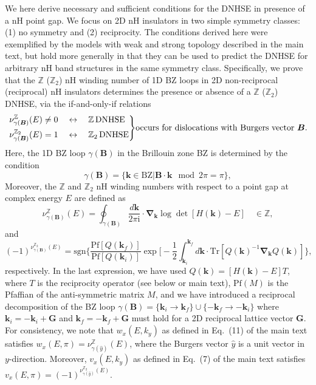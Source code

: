 \documentclass[prb,reprint,twocolumn,preprintnumbers,amsmath,amssymb,showpacs,nofootinbib,superscriptaddress]{revtex4-2}
\newenvironment{rcases}
  {\left.\begin{aligned}}
  {\end{aligned}\right\rbrace}
\newcommand{\bs}[1]{\boldsymbol{#1}}
\begin{document}
We here derive necessary and sufficient conditions for the DNHSE in presence of a nH point gap. We focus on 2D nH insulators in two simple symmetry classes: (1) no symmetry and (2) reciprocity. The conditions derived here were exemplified by the models with weak and strong topology described in the main text, but hold more generally in that they can be used to predict the DNHSE for arbitrary nH band structures in the same symmetry class.
Specifically, we prove that the $\mathbb{Z}$ ($\mathbb{Z}_2$) nH winding number of 1D BZ loops in 2D non-reciprocal (reciprocal) nH insulators determines the presence or absence of a $\mathbb{Z}$ ($\mathbb{Z}_2$) DNHSE, via the if-and-only-if relations
\begin{equation} \label{eq: nonhermcorrespondence}
\begin{rcases}
  \nu^{\mathbb{Z}}_{\gamma(\bs{B})}(E) \neq 0 \quad &\leftrightarrow \quad \mathbb{Z} \, \text{DNHSE} \\
  \nu^{\mathbb{Z}_2}_{\gamma(\bs{B})}(E) = 1 \quad &\leftrightarrow \quad \mathbb{Z}_2 \, \text{DNHSE}
\end{rcases} \text{occurs for dislocations with Burgers vector } \bs{B}.
\end{equation}
Here, the 1D BZ loop $\gamma(\bs{B})$ in the Brillouin zone BZ is determined by the condition 
\begin{equation}
\gamma(\bs{B}) = \{\bs{k}\in \mathrm{BZ}|\bs{B} \cdot \bs{k} \mod 2\pi = \pi \}, 
\end{equation}
Moreover, the $\mathbb{Z}$ and $\mathbb{Z}_2$ nH winding numbers with respect to a point gap at complex energy $E$ are defined as
\begin{equation}
    \nu^{\mathbb{Z}}_{\gamma(\bs{B})}(E) = \oint_{\gamma(\bs{B})} \frac{d\bs{k}}{2\pi \mathrm{i}} \cdot \bs{\nabla_k} \log \det \left[H(\bs{k})-E\right] \quad \in \mathbb{Z},
\end{equation}
and
\begin{equation}
    (-1)^{\nu^{\mathbb{Z}_2}_{\gamma(\bs{B})}(E)} = \mathrm{sgn} \Bigg\{\frac{\mathrm{Pf}[Q(\bs{k}_f)]}{\mathrm{Pf}[Q(\bs{k}_i)]} \exp \bigg[-\frac{1}{2} \int_{\bs{k}_i}^{\bs{k}_f} d\bs{k} \cdot \mathrm{Tr}\left[Q(\bs{k})^{-1} \bs{\nabla_k} Q(\bs{k})\right]\Bigg\},
\end{equation}
respectively. In the last expression, we have used $Q(\bs{k}) = [H(\bs{k})-E]T$, where $T$ is the reciprocity operator (see below or main text), $\mathrm{Pf}(M)$ is the Pfaffian of the anti-symmetric matrix $M$, and we have introduced a reciprocal decomposition of the BZ loop $\gamma(\bs{B}) = \{\bs{k}_i \rightarrow \bs{k}_f\} \cup \{-\bs{k}_f \rightarrow -\bs{k}_i\}$ where $\bs{k}_i = -\bs{k}_i+\bs{G}$ and $\bs{k}_f = -\bs{k}_f+\bs{G}$ must hold for a 2D reciprocal lattice vector $\bs{G}$. For consistency, we note that $w_x(E,k_y)$ as defined in Eq.~(11) of the main text satisfies $w_x(E,\pi) = \nu^{\mathbb{Z}}_{\gamma(\hat{y})}(E)$, where the Burgers vector $\hat{y}$ is a unit vector in $y$-direction. Moreover, $v_x(E,k_y)$ as defined in Eq.~(7) of the main text satisfies $v_x(E,\pi)=(-1)^{\nu^{\mathbb{Z}_2}_{\gamma(\hat{y})}(E)}$.
\end{document}
